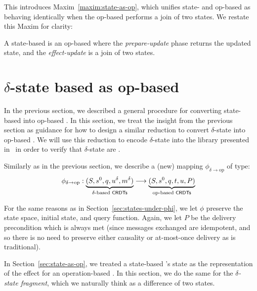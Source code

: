 This introduces Maxim~\ref{maxim:state-as-op}, which unifies state- and op-based
\CRDTs as behaving identically when the op-based \CRDT performs a join of two
states. We restate this Maxim for clarity:

\setcounter{maxim}{0}
\begin{maxim}
  A state-based \CRDT is an op-based \CRDT where the \emph{prepare-update} phase
  returns the updated state, and the \emph{effect-update} is a join of two
  states.
\end{maxim}

\section{$\delta$-state based \CRDTs as op-based}
\label{sec:delta-as-op}

In the previous section, we described a general procedure for converting
state-based \CRDTs into op-based \CRDTs. In this section, we treat the insight
from the previous section as guidance for how to design a similar reduction to
convert $\delta$-state \CRDTs into op-based \CRDTs. We will use this reduction
to encode $\delta$-state \CRDTs into the library presented in~\citet{gomes17} in
order to verify that $\delta$-state \CRDTs are \SEC.

Similarly as in the previous section, we describe a (new) mapping $\phi_{\delta
\to \text{op}}$ of type:
\[
  \phi_{\delta \to \text{op}} :
    \underbrace{(S, s^0, q, u^\delta, m^\delta)}_{\text{$\delta$-based \textsf{CRDTs}}}
    \longrightarrow
    \underbrace{(S, s^0, q, t, u, P)}_{\text{op-based \textsf{CRDTs}}}
\]

For the same reasons as in Section~\ref{sec:states-under-phi}, we let $\phi$
preserve the state space, initial state, and query function. Again, we let $P$
be the delivery precondition which is always met (since messages exchanged are
idempotent, and so there is no need to preserve either causality or at-most-once
delivery as is traditional).

In Section~\ref{sec:state-as-op}, we treated a state-based \CRDT's state as
the representation of the effect for an operation-based \CRDT. In this section,
we do the same for the \emph{$\delta$-state fragment}, which we naturally think
as a difference of two states.

